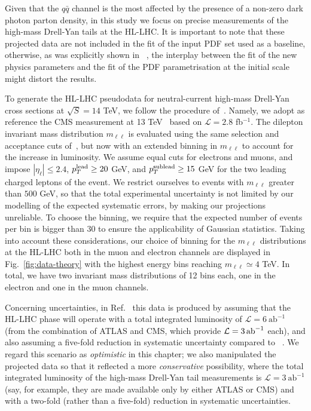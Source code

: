 \documentclass[withindex,glossary]{cam-thesis}
\begin{document}
Given that the $q\bar{q}$ channel is the most affected by the presence of a non-zero dark photon parton density, in this
study we focus on precise measurements of the high-mass Drell-Yan
tails at the HL-LHC. It is important to note that these projected data are not
included in the fit of the input PDF set used as a baseline,
otherwise, as was explicitly shown in ~\cite{Carrazza:2019sec,Greljo:2021kvv,Iranipour:2022iak}, the interplay between the fit of the
new physics parameters and the fit of the PDF parametrisation at the
initial scale might distort the results. 

To generate the HL-LHC pseudodata for neutral-current
high-mass Drell-Yan cross sections at $\sqrt{S}=14$ TeV, we follow the procedure of~\cite{Greljo:2021kvv}.
Namely, we adopt as reference the CMS  measurement at 13 TeV~\cite{CMS:2018mdl} based on $\mathcal{L}=2.8$ fb$^{-1}$.
%
The dilepton invariant mass distribution $m_{\ell\ell}$ is evaluated using the same selection
and acceptance cuts of~\cite{CMS:2018mdl}, but now with an extended
binning in $m_{\ell\ell}$ to account for the increase in luminosity.
%
We assume equal cuts for electrons and muons, and impose $|\eta_\ell|\le 2.4$,
$p_T^{\rm lead}\ge 20$ GeV, and $p_T^{\rm sublead}\ge 15$ GeV for the two
leading charged leptons of the event.
We restrict ourselves to  events with $m_{\ell\ell}$ greater than $500$ GeV, so that 
the total experimental uncertainty is not limited by our modelling
of the expected systematic errors, by making our projections unreliable.
%
To choose the binning, we require that the expected number of events per bin
is bigger than 30 to ensure the applicability of Gaussian statistics.
%
Taking into account these considerations, our choice of binning
for the $m_{\ell\ell}$ distributions at the HL-LHC both in the muon and electron channels 
are displayed in Fig.~\ref{fig:data-theory} with the highest energy bins reaching $m_{\ell\ell}\simeq 4 $ TeV.
In total, we have two invariant mass distributions of 12 bins each, one in the electron and one in the muon channels.

Concerning uncertainties, in Ref.~\cite{Greljo:2021kvv} this data is produced by assuming that the HL-LHC phase will
operate with a total integrated luminosity of $\mathcal{L} = 6\ \text{ab}^{-1}$
(from the combination of ATLAS and CMS, which provide ${\cal L}=3 \,{\rm ab}^{-1}$ each),
and also assuming a five-fold reduction in systematic uncertainty
compared to ~\cite{CMS:2018mdl}. 
We regard this scenario as {\it optimistic} in this chapter; we also
manipulated the projected data so that it reflected a more {\it
  conservative} possibility, where the total integrated luminosity of
the high-mass Drell-Yan tail measurements is $\mathcal{L} = 3\
\text{ab}^{-1}$ (say, for example, they are made available only by
either ATLAS or CMS) and with a two-fold (rather than a five-fold) reduction in systematic uncertainties.
\end{document}
